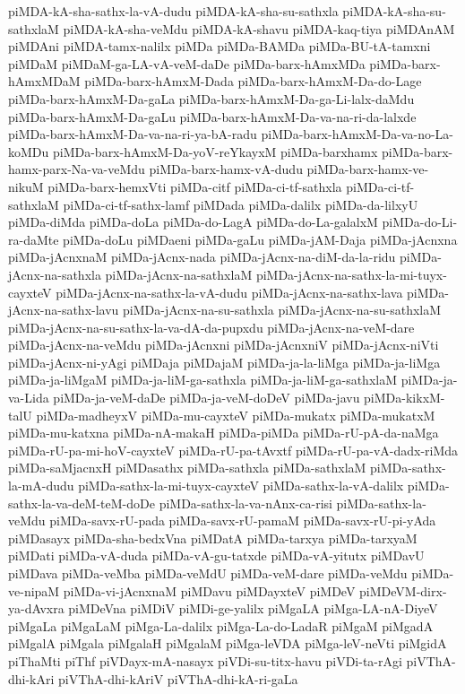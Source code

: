 {piMDA-kA-sha-sathx-la-vA-dudu
piMDA-kA-sha-su-sathxla
piMDA-kA-sha-su-sathxlaM
piMDA-kA-sha-veMdu
piMDA-kA-shavu
piMDA-kaq-tiya
piMDAnAM
piMDAni
piMDA-tamx-nalilx
piMDa
piMDa-BAMDa
piMDa-BU-tA-tamxni
piMDaM
piMDaM-ga-LA-vA-veM-daDe
piMDa-barx-hAmxMDa
piMDa-barx-hAmxMDaM
piMDa-barx-hAmxM-Dada
piMDa-barx-hAmxM-Da-do-Lage
piMDa-barx-hAmxM-Da-gaLa
piMDa-barx-hAmxM-Da-ga-Li-lalx-daMdu
piMDa-barx-hAmxM-Da-gaLu
piMDa-barx-hAmxM-Da-va-na-ri-da-lalxde
piMDa-barx-hAmxM-Da-va-na-ri-ya-bA-radu
piMDa-barx-hAmxM-Da-va-no-La-koMDu
piMDa-barx-hAmxM-Da-yoV-reYkayxM
piMDa-barxhamx
piMDa-barx-hamx-parx-Na-va-veMdu
piMDa-barx-hamx-vA-dudu
piMDa-barx-hamx-ve-nikuM
piMDa-barx-hemxVti
piMDa-citf
piMDa-ci-tf-sathxla
piMDa-ci-tf-sathxlaM
piMDa-ci-tf-sathx-lamf
piMDada
piMDa-dalilx
piMDa-da-lilxyU
piMDa-diMda
piMDa-doLa
piMDa-do-LagA
piMDa-do-La-galalxM
piMDa-do-Li-ra-daMte
piMDa-doLu
piMDaeni
piMDa-gaLu
piMDa-jAM-Daja
piMDa-jAcnxna
piMDa-jAcnxnaM
piMDa-jAcnx-nada
piMDa-jAcnx-na-diM-da-la-ridu
piMDa-jAcnx-na-sathxla
piMDa-jAcnx-na-sathxlaM
piMDa-jAcnx-na-sathx-la-mi-tuyx-cayxteV
piMDa-jAcnx-na-sathx-la-vA-dudu
piMDa-jAcnx-na-sathx-lava
piMDa-jAcnx-na-sathx-lavu
piMDa-jAcnx-na-su-sathxla
piMDa-jAcnx-na-su-sathxlaM
piMDa-jAcnx-na-su-sathx-la-va-dA-da-pupxdu
piMDa-jAcnx-na-veM-dare
piMDa-jAcnx-na-veMdu
piMDa-jAcnxni
piMDa-jAcnxniV
piMDa-jAcnx-niVti
piMDa-jAcnx-ni-yAgi
piMDaja
piMDajaM
piMDa-ja-la-liMga
piMDa-ja-liMga
piMDa-ja-liMgaM
piMDa-ja-liM-ga-sathxla
piMDa-ja-liM-ga-sathxlaM
piMDa-ja-va-Lida
piMDa-ja-veM-daDe
piMDa-ja-veM-doDeV
piMDa-javu
piMDa-kikxM-talU
piMDa-madheyxV
piMDa-mu-cayxteV
piMDa-mukatx
piMDa-mukatxM
piMDa-mu-katxna
piMDa-nA-makaH
piMDa-piMDa
piMDa-rU-pA-da-naMga
piMDa-rU-pa-mi-hoV-cayxteV
piMDa-rU-pa-tAvxtf
piMDa-rU-pa-vA-dadx-riMda
piMDa-saMjacnxH
piMDasathx
piMDa-sathxla
piMDa-sathxlaM
piMDa-sathx-la-mA-dudu
piMDa-sathx-la-mi-tuyx-cayxteV
piMDa-sathx-la-vA-dalilx
piMDa-sathx-la-va-deM-teM-doDe
piMDa-sathx-la-va-nAnx-ca-risi
piMDa-sathx-la-veMdu
piMDa-savx-rU-pada
piMDa-savx-rU-pamaM
piMDa-savx-rU-pi-yAda
piMDasayx
piMDa-sha-bedxVna
piMDatA
piMDa-tarxya
piMDa-tarxyaM
piMDati
piMDa-vA-duda
piMDa-vA-gu-tatxde
piMDa-vA-yitutx
piMDavU
piMDava
piMDa-veMba
piMDa-veMdU
piMDa-veM-dare
piMDa-veMdu
piMDa-ve-nipaM
piMDa-vi-jAcnxnaM
piMDavu
piMDayxteV
piMDeV
piMDeVM-dirx-ya-dAvxra
piMDeVna
piMDiV
piMDi-ge-yalilx
piMgaLA
piMga-LA-nA-DiyeV
piMgaLa
piMgaLaM
piMga-La-dalilx
piMga-La-do-LadaR
piMgaM
piMgadA
piMgalA
piMgala
piMgalaH
piMgalaM
piMga-leVDA
piMga-leV-neVti
piMgidA
piThaMti
piThf
piVDayx-mA-nasayx
piVDi-su-titx-havu
piVDi-ta-rAgi
piVThA-dhi-kAri
piVThA-dhi-kAriV
piVThA-dhi-kA-ri-gaLa
}
